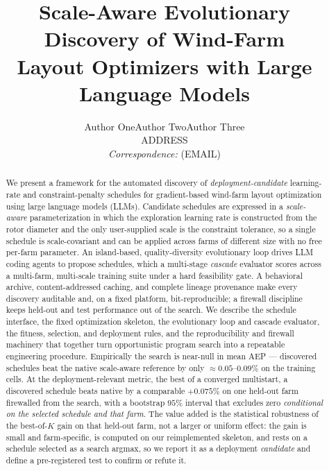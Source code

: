 \documentclass[11pt]{article}
\title{\vspace{-1.5em}\bfseries\large Scale-Aware Evolutionary Discovery of Wind-Farm\\
Layout Optimizers with Large Language Models}
\author{\normalsize Author One\quad Author Two\quad Author Three\\[0.2em]
\small ADDRESS\\[-0.2em]\small \textit{Correspondence:} (EMAIL)}
\date{}
\begin{document}
\maketitle
\thispagestyle{empty}
\linenumbers

\vspace{-1.2em}
\begin{abstract}
\noindent
We present a framework for the automated discovery of \emph{deployment-candidate}
learning-rate and constraint-penalty schedules for gradient-based wind-farm layout
optimization using large language models (LLMs). Candidate schedules are expressed in a
\emph{scale-aware} parameterization in which the exploration learning rate is
constructed from the rotor diameter and the only user-supplied scale is the
constraint tolerance, so a single schedule is scale-covariant and can be applied across
farms of different size with no free per-farm parameter. An island-based, quality-diversity
evolutionary loop drives LLM coding agents to propose schedules, which a multi-stage
\emph{cascade} evaluator scores across a multi-farm, multi-scale training suite under
a hard feasibility gate. A behavioral archive, content-addressed caching, and
complete lineage provenance make every discovery auditable and, on a fixed platform,
bit-reproducible; a firewall discipline keeps held-out and test performance out of the search. We
describe the schedule interface, the fixed optimization skeleton, the evolutionary
loop and cascade evaluator, the fitness, selection, and deployment rules, and the
reproducibility and firewall machinery that together turn opportunistic program
search into a repeatable engineering procedure. Empirically the search is near-null in
mean AEP --- discovered schedules beat the native scale-aware reference by only
$\approx\!0.05$--$0.09\%$ on the training cells. At the deployment-relevant metric, the
best of a converged multistart, a discovered schedule beats native by a comparable
$+0.075\%$ on one held-out farm firewalled from the search, with a bootstrap $95\%$
interval that excludes zero \emph{conditional on the selected schedule and that farm}. The
value added is the statistical robustness of the best-of-$K$ gain on that held-out farm,
not a larger or uniform effect: the gain is small and farm-specific, is computed on our
reimplemented skeleton, and rests on a schedule selected as a search argmax, so we report
it as a deployment \emph{candidate} and define a pre-registered test to confirm or refute
it.
\end{abstract}
\end{document}
